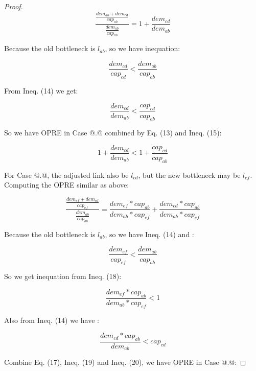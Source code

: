\documentclass[conference]{IEEEtran}
\makeatletter
\newcommand{\Rmnum}[1]{\expandafter\@slowromancap\romannumeral #1@}
\makeatother
\begin{document}
\begin{proof}
\begin{equation}
\frac {\frac{dem_{ab} + dem_{cd}}{cap_{ab}}} {\frac{dem_{ab}}{cap_{ab}}} = 1 + \frac{dem_{cd}}{dem_{ab}}
\end{equation}

Because the old bottleneck is $l_{ab}$, so we have inequation:

\begin{equation}
\frac {dem_{cd}} {cap_{cd}} < \frac {dem_{ab}} {cap_{ab}}
\end{equation}

From Ineq. (14) we get:

\begin{equation}
\frac {dem_{cd}} {dem_{ab}} < \frac {cap_{cd}} {cap_{ab}}
\end{equation}

So we have OPRE in Case \Rmnum{1}.\Rmnum{1} combined by Eq. (13) and Ineq. (15):

\begin{equation}
1 + \frac {dem_{cd}} {dem_{ab}} < 1 + \frac {cap_{cd}} {cap_{ab}}
\end{equation}

For Case \Rmnum{1}.\Rmnum{2}, the adjusted link also be $l_{cd}$, but the new bottleneck may be $l_{ef}$.
Computing the OPRE similar as above:

\begin{equation}
\frac {\frac{dem_{ef} + dem_{cd}}{cap_{ef}}} {\frac{dem_{ab}}{cap_{ab}}} = 
\frac {dem_{ef} * cap_{ab}}{dem_{ab} * cap_{ef}} + \frac {dem_{cd} * cap_{ab}}{dem_{ab} * cap_{ef}}
\end{equation}

Because the old bottleneck is $l_{ab}$, so we have Ineq. (14) and :

\begin{equation}
\frac {dem_{ef}} {cap_{ef}} < \frac {dem_{ab}} {cap_{ab}}
\end{equation}

So we get inequation from Ineq. (18):

\begin{equation}
\frac {dem_{ef} * cap_{ab}} {dem_{ab} * cap_{ef}} < 1
\end{equation}

Also from Ineq. (14) we have :

\begin{equation}
\frac {dem_{cd} * cap_{ab}} {dem_{ab}} < cap_{cd}
\end{equation}

Combine Eq. (17), Ineq. (19) and Ineq. (20), we have OPRE in Case \Rmnum{1}.\Rmnum{2}:


\end{proof}
\end{document}
